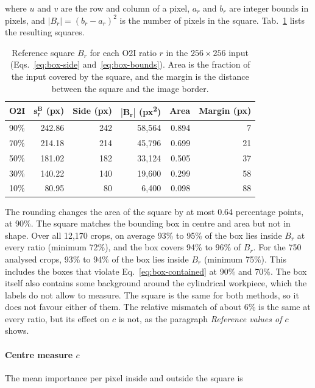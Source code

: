 where $u$ and $v$ are the row and column of a pixel, $a_r$ and $b_r$ are integer
bounds in pixels, and $|B_r| = (b_r - a_r)^2$ is the number of pixels in the square.
Tab.~\ref{tab:reference-square} lists the resulting squares.

\begin{table}[htbp]
\centering
\caption[Reference square per ratio]{Reference square $B_r$ for each O2I ratio $r$ in
the $256 \times 256$ input (Eqs.~\eqref{eq:box-side} and~\eqref{eq:box-bounds}). Area is
the fraction of the input covered by the square, and the margin is the distance between
the square and the image border.}
\label{tab:reference-square}
\begin{tabular}{lrrrrr}
\toprule
O2I & $\boldsymbol{s^{B}_{r}}$ (px) & Side (px) &
$\boldsymbol{|B_r|}$ (px\textsuperscript{2}) & Area &
Margin (px) \\
\midrule
90\% & 242.86 & 242 & 58,564 & 0.894 & 7 \\
70\% & 214.18 & 214 & 45,796 & 0.699 & 21 \\
50\% & 181.02 & 182 & 33,124 & 0.505 & 37 \\
30\% & 140.22 & 140 & 19,600 & 0.299 & 58 \\
10\% & 80.95 & 80 & 6,400 & 0.098 & 88 \\
\bottomrule
\end{tabular}
\end{table}

The rounding changes the area of the square by at most 0.64 percentage points, at
90\%. The square matches the bounding box in centre and area but not in shape. Over
all 12,170 crops, on average 93\% to 95\% of the box lies inside $B_r$ at every ratio
(minimum 72\%), and the box covers 94\% to 96\% of $B_r$. For the 750 analysed crops,
93\% to 94\% of the box lies inside $B_r$ (minimum 75\%). This includes the boxes that
violate Eq.~\eqref{eq:box-contained} at 90\% and 70\%. The box itself also contains
some background around the cylindrical workpiece, which the labels do not allow to
measure. The square is the same for both methods, so it does not favour either of
them. The relative mismatch of about 6\% is the same at every ratio, but its effect on
$c$ is not, as the paragraph \emph{Reference values of $c$} shows.

\paragraph{Centre measure $c$}
\label{sec:methodology-centerfrac}
The mean importance per pixel inside and outside the square is

